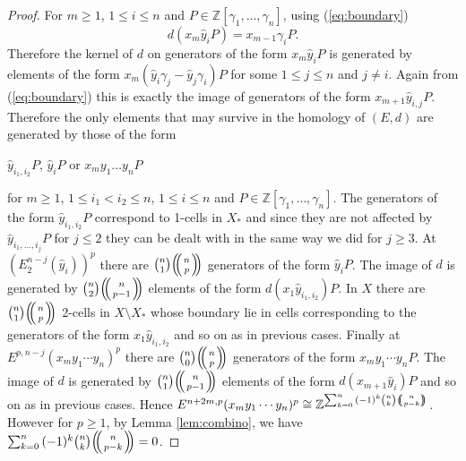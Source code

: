\documentclass{article}
\theoremstyle{plain}
\theoremstyle{definition}
\numberwithin{thm}{section}
\begin{document}
\begin{proof}
					For $m\geq 1$, $1\leq i\leq n$ and $P\in \mathbb{Z}[\gamma_1,\dots,\gamma_n]$, using (\ref{eq:boundary})
					\begin{equation*}
						d(x_m\hat{y}_iP)=x_{m-1}\gamma_i P.
					\end{equation*}
					Therefore the kernel of $d$ on generators of the form $x_m\hat{y}_iP$ is generated by elements of the form $x_m(\hat{y}_i \gamma_j-\hat{y}_j \gamma_i)P$
					for some $1\leq j \leq n$ and $j\neq i$.
					Again from (\ref{eq:boundary}) this is exactly the image of generators of the form $x_{m+1}\hat{y}_{i,j}P$.
					Therefore the only elements that may survive in the homology of $(E,d)$ are generated by those of the form
					\begin{center}
						$\hat{y}_{i_1,i_2}P$, $\hat{y}_i P$ or $x_m y_1\dots y_n P$
					\end{center}
					for $m\geq 1$, $1\leq i_1<i_2 \leq n$, $1\leq i\leq n$ and $P\in \mathbb{Z}[\gamma_1,\dots,\gamma_n]$.
					The generators of the form $\hat{y}_{i_1,i_2}P$ correspond to 1-cells in $X_*$
					and since they are not affected by $\hat{y}_{i_1,\dots,i_j}P$ for $j\leq 2$ they can be dealt with in the same way we did for $j\geq 3$.
					At $(E_{2}^{n-j}(\hat{y}_i))^p$ there are $\binom{n}{1}{\ensuremath{\left(\kern-.3em\left(\genfrac{}{}{0pt}{}{{n}}{{p}}\right)\kern-.3em\right)}}$ generators of the form $\hat{y}_i P$.
					The image of $d$ is generated by $\binom{n}{2}{\ensuremath{\left(\kern-.3em\left(\genfrac{}{}{0pt}{}{{n}}{{p-1}}\right)\kern-.3em\right)}}$ elements of the form $d(x_1\hat{y}_{i_1,i_2})P$.
					In $X$ there are $\binom{n}{1}{\ensuremath{\left(\kern-.3em\left(\genfrac{}{}{0pt}{}{{n}}{{p}}\right)\kern-.3em\right)}}$ 2-cells in $X\setminus X_*$
					whose boundary lie in cells corresponding to the generators of the form $x_1\hat{y}_{i_1,i_2}$ and so on as in previous cases.
					Finally at $E^{p,n-j}(x_m y_1\cdots y_n)^p$ there are $\binom{n}{0}{\ensuremath{\left(\kern-.3em\left(\genfrac{}{}{0pt}{}{{n}}{{p}}\right)\kern-.3em\right)}}$ generators of the form $x_m y_1\cdots y_n P$.
					The image of $d$ is generated by $\binom{n}{1}{\ensuremath{\left(\kern-.3em\left(\genfrac{}{}{0pt}{}{{n}}{{p-1}}\right)\kern-.3em\right)}}$ elements of the form $d(x_{m+1}\hat{y}_{i})P$ and so on as in previous cases.
					Hence $E^{n+2m,p}(x_m y_1\cdots y_n)^p\cong \mathbb{Z}^{\sum_{k=0}^{n}{(-1)^k\binom{n}{k}{\ensuremath{\:\left(\kern-.5em\left(\genfrac{}{}{0pt}{}{{n}}{{p-k}}\right)\kern-.5em\right)\:}}}}$.
					However for $p\geq 1$, by Lemma \ref{lem:combino}, we have $\sum_{k=0}^{n}{(-1)^k\binom{n}{k}{\ensuremath{\left(\kern-.3em\left(\genfrac{}{}{0pt}{}{{n}}{{p-k}}\right)\kern-.3em\right)}}}=0$.
					
			\end{proof}
			
\end{document}
